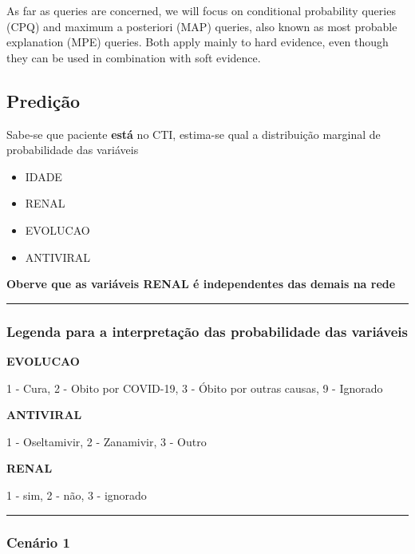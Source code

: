 \documentclass[
]{article}
\providecommand{\tightlist}{%
  \setlength{\itemsep}{0pt}\setlength{\parskip}{0pt}}
\begin{document}
As far as queries are concerned, we will focus on conditional
probability queries (CPQ) and maximum a posteriori (MAP) queries, also
known as most probable explanation (MPE) queries. Both apply mainly to
hard evidence, even though they can be used in combination with soft
evidence.

\hypertarget{prediuxe7uxe3o}{%
\subsection{Predição}\label{prediuxe7uxe3o}}

Sabe-se que paciente \textbf{está} no CTI, estima-se qual a distribuição
marginal de probabilidade das variáveis

\begin{itemize}
\tightlist
\item
  IDADE
\item
  RENAL
\item
  EVOLUCAO
\item
  ANTIVIRAL
\end{itemize}

\textbf{Oberve que as variáveis RENAL é independentes das demais na
rede}

\begin{center}\rule{0.5\linewidth}{0.5pt}\end{center}

\hypertarget{legenda-para-a-interpretauxe7uxe3o-das-probabilidade-das-variuxe1veis}{%
\subsubsection{Legenda para a interpretação das probabilidade das
variáveis}\label{legenda-para-a-interpretauxe7uxe3o-das-probabilidade-das-variuxe1veis}}

\textbf{EVOLUCAO}

1 - Cura, 2 - Obito por COVID-19, 3 - Óbito por outras causas, 9 -
Ignorado

\textbf{ANTIVIRAL}

1 - Oseltamivir, 2 - Zanamivir, 3 - Outro

\textbf{RENAL}

1 - sim, 2 - não, 3 - ignorado

\begin{center}\rule{0.5\linewidth}{0.5pt}\end{center}

\hypertarget{cenuxe1rio-1}{%
\subsubsection{Cenário 1}\label{cenuxe1rio-1}}
\end{document}
